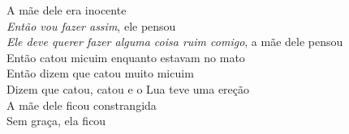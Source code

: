 \bigskip

\begin{linenumbers}\begingroup\raggedright
\noindent A mãe dele era inocente\\
\emph{Então vou fazer assim}, ele pensou\\
\emph{Ele deve querer fazer alguma coisa ruim comigo}, a mãe dele pensou\\
Então catou micuim enquanto estavam no mato\\
Então dizem que catou muito micuim\\
Dizem que catou, catou e o Lua teve uma ereção\\
A mãe dele ficou constrangida\\
Sem graça, ela ficou
\end{linenumbers}\endgroup

\bigskip

